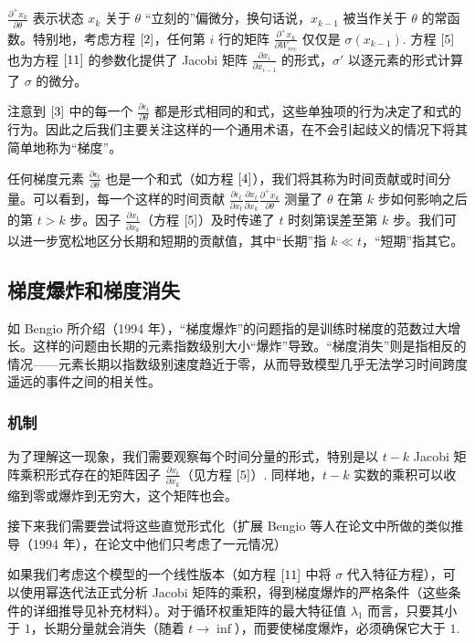 \(\frac{\partial^+x_k}{\partial\theta}\) 表示状态 \(x_k\) 关于 \(\theta\) “立刻的”偏微分，换句话说，\(x_{k-1}\) 被当作关于 \(\theta\) 的常函数。特别地，考虑方程 \(\eqref{2}\)，任何第 \(i\) 行的矩阵 \(\frac{\partial^+x_k}{\partial W_{rec}}\) 仅仅是 \(\sigma(x_{k-1})\). 方程 \(\eqref{5}\) 也为方程 \(\eqref{11}\) 的参数化提供了 Jacobi 矩阵 \(\frac{\partial x_i}{\partial x_{i-1}}\) 的形式，\(\sigma '\) 以逐元素的形式计算了 \(\sigma\) 的微分。

注意到 \(\eqref{3}\) 中的每一个 \(\frac{\partial\epsilon_t}{\partial\theta}\) 都是形式相同的和式，这些单独项的行为决定了和式的行为。因此之后我们主要关注这样的一个通用术语，在不会引起歧义的情况下将其简单地称为“梯度”。

任何梯度元素 \(\frac{\partial\epsilon_t}{\partial\theta}\) 也是一个和式（如方程 \(\eqref{4}\)），我们将其称为时间贡献或时间分量。可以看到，每一个这样的时间贡献 \(\frac{\partial\epsilon_t}{\partial x_t}\frac{\partial x_t}{\partial x_k}\frac{\partial^+x_k}{\partial\theta}\) 测量了 \(\theta\) 在第 \(k\) 步如何影响之后的第 \(t>k\) 步。因子 \(\frac{\partial x_t}{\partial x_k}\)（方程 \(\eqref{5}\)）及时传递了 \(t\) 时刻第误差至第 \(k\) 步。我们可以进一步宽松地区分长期和短期的贡献值，其中“长期”指 \(k\ll t\)，“短期”指其它。

\subsection{梯度爆炸和梯度消失}\label{2-ux68afux5ea6ux7206ux70b8ux548cux68afux5ea6ux6d88ux5931}

如 Bengio 所介绍（1994 年），“梯度爆炸”的问题指的是训练时梯度的范数过大增长。这样的问题由长期的元素指数级别大小“爆炸”导致。“梯度消失”则是指相反的情况------元素长期以指数级别速度趋近于零，从而导致模型几乎无法学习时间跨度遥远的事件之间的相关性。

\subsubsection{机制}\label{21-ux673aux5236}

为了理解这一现象，我们需要观察每个时间分量的形式，特别是以 \(t-k\) Jacobi 矩阵乘积形式存在的矩阵因子 \(\frac{\partial x_t}{\partial x_k}\)（见方程 \(\eqref{5}\)）. 同样地，\(t-k\) 实数的乘积可以收缩到零或爆炸到无穷大，这个矩阵也会。

接下来我们需要尝试将这些直觉形式化（扩展 Bengio 等人在论文中所做的类似推导（1994 年），在论文中他们只考虑了一元情况）

如果我们考虑这个模型的一个线性版本（如方程 \(\eqref{11}\) 中将 \(\sigma\) 代入特征方程），可以使用幂迭代法正式分析 Jacobi 矩阵的乘积，得到梯度爆炸的严格条件（这些条件的详细推导见补充材料）。对于循环权重矩阵的最大特征值 \(\lambda_1\) 而言，只要其小于 \(1\)，长期分量就会消失（随着 \(t\to \inf\)），而要使梯度爆炸，必须确保它大于 \(1\).

